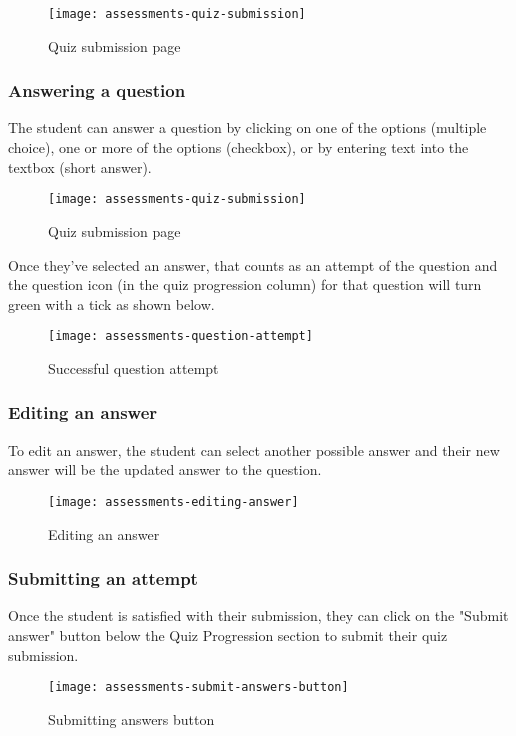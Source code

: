 \begin{figure}[!hbpt]
	\centering
	\texttt{[image: assessments-quiz-submission]}
	\caption{Quiz submission page}
\end{figure}

\subsubsection{Answering a question}
The student can answer a question by clicking on one of the options (multiple choice), one or more of the options (checkbox), or by entering text into the textbox (short answer). 

\begin{figure}[!hbpt]
	\centering
	\texttt{[image: assessments-quiz-submission]}
	\caption{Quiz submission page}
\end{figure}

Once they've selected an answer, that counts as an attempt of the question and the question icon (in the quiz progression column) for that question will turn green with a tick as shown below.

\begin{figure}[!hbpt]
	\centering
	\texttt{[image: assessments-question-attempt]}
	\caption{Successful question attempt}
\end{figure}


\subsubsection{Editing an answer}
To edit an answer, the student can select another possible answer and their new answer will be the updated answer to the question.

\begin{figure}[!hbpt]
	\centering
	\texttt{[image: assessments-editing-answer]}
	\caption{Editing an answer}
\end{figure}


\subsubsection{Submitting an attempt}
Once the student is satisfied with their submission, they can click on the "Submit answer" button below the Quiz Progression section to submit their quiz submission.

\begin{figure}[!hbpt]
	\centering
	\texttt{[image: assessments-submit-answers-button]}
	\caption{Submitting answers button}
\end{figure}

